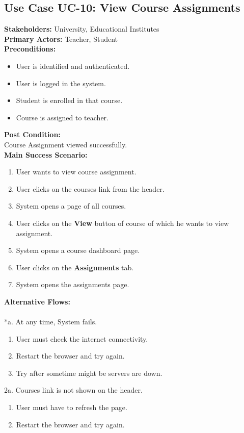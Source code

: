 \subsection{Use Case UC-10: View Course Assignments}
\textbf{Stakeholders: } University, Educational Institutes \\
\textbf{Primary Actors: }Teacher, Student \\
\textbf{Preconditions:}
\begin{itemize}
\item User is identified and authenticated.
\item User is logged in the system.
\item Student is enrolled in that course.
\item Course is assigned to teacher.
\end{itemize}
\textbf{Post Condition: }\\
Course Assignment viewed successfully.\\
\textbf{Main Success Scenario:}
\begin{enumerate}
\item User wants to view course assignment.
\item User clicks on the courses link from the header.
\item System opens a page of all courses.
\item User clicks on the \textbf{View} button of course of which he wants to view assignment.
\item System opens a course dashboard page.
\item User clicks on the \textbf{Assignments} tab.
\item System opens the assignments page.
\end{enumerate}
\textbf{Alternative Flows:}\\
\\
*a. At any time, System fails.
\begin{enumerate}
\item User must check the internet connectivity.
\item Restart the browser and try again.
\item Try after sometime might be servers are down.
\end{enumerate}
2a. Courses link is not shown on the header.
\begin{enumerate}
\item User must have to refresh the page.
\item Restart the browser and try again.
\end{enumerate} 
